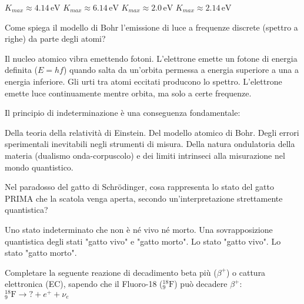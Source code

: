 \documentclass{exam}%
\begin{document}
\begin{questions}
\vspace{0.2em}%
\begin{multicols}{4}%
\begin{choices}%
\choice $K_{max} \approx 4.14 \, \text{eV}$%
\choice $K_{max} \approx 6.14 \, \text{eV}$%
\choice $K_{max} \approx 2.0 \, \text{eV}$%
\choice $K_{max} \approx 2.14 \, \text{eV}$%
\end{choices}%
\end{multicols}%
\question Come spiega il modello di Bohr l'emissione di luce a frequenze discrete (spettro a righe) da parte degli atomi?%
\vspace{0.2em}%
\begin{choices}%
\choice Il nucleo atomico vibra emettendo fotoni.%
\choice L'elettrone emette un fotone di energia definita ($E = hf$) quando salta da un'orbita permessa a energia superiore a una a energia inferiore.%
\choice Gli urti tra atomi eccitati producono lo spettro.%
\choice L'elettrone emette luce continuamente mentre orbita, ma solo a certe frequenze.%
\end{choices}%
\question Il principio di indeterminazione è una conseguenza fondamentale:%
\vspace{0.2em}%
\begin{choices}%
\choice Della teoria della relatività di Einstein.%
\choice Del modello atomico di Bohr.%
\choice Degli errori sperimentali inevitabili negli strumenti di misura.%
\choice Della natura ondulatoria della materia (dualismo onda-corpuscolo) e dei limiti intrinseci alla misurazione nel mondo quantistico.%
\end{choices}%
\question Nel paradosso del gatto di Schrödinger, cosa rappresenta lo stato del gatto PRIMA che la scatola venga aperta, secondo un'interpretazione strettamente quantistica?%
\vspace{0.2em}%
\begin{choices}%
\choice Uno stato indeterminato che non è né vivo né morto.%
\choice Una sovrapposizione quantistica degli stati "gatto vivo" e "gatto morto".%
\choice Lo stato "gatto vivo".%
\choice Lo stato "gatto morto".%
\end{choices}%
\question Completare la seguente reazione di decadimento beta più ($\beta^+$) o cattura elettronica (EC), sapendo che il Fluoro-18 ($^{18}_{9}\text{F}$) può decadere $\beta^+$: $^{18}_{9}\text{F} \rightarrow ? + e^+ + \nu_e$%
\vspace{0.2em}%
\begin{multicols}{4}%
\begin{choices}%

\end{choices}
\end{multicols}
\end{questions}
\end{document}
